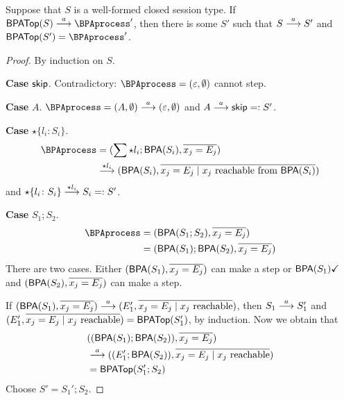 \begin{lemma}\label{lemma:bisimulation-BPA-backwards}
  Suppose that $S$ is a well-formed closed session type. If
  $\toBPATop{S} \LTSderives \BPAprocess'$, then there is some $S'$
  such that $S \LTSderives S'$ and $\toBPATop{S'} = \BPAprocess'$.
\end{lemma}
\begin{proof}
  By induction on $S$.

  \textbf{Case }$\skipk$. Contradictory: $\BPAprocess = (\varepsilon, \emptyset)$ cannot step.

  \textbf{Case }$A$. $\BPAprocess = (A, \emptyset)
  \LTSderives (\varepsilon, \emptyset)$ and $A \LTSderives \skipk =: S'$.

  \textbf{Case }$\star\{l_i\colon S_i\}$. 
  \begin{align*}
    \BPAprocess
    & = (\sum\star l_i; \toBPA{S_i},  \overline{x_j =  E_j}) \\
    & \LTSderives[\star l_i] (\toBPA{S_i}, \overline{x_j =  E_j \mid x_j \text{ reachable from }\toBPA{S_i}})
  \end{align*}
  and
  $\star\{l_i\colon S_i\} \LTSderives[\star l_i] S_i =: S'$.

  \textbf{Case }$S_1;S_2$.
  \begin{align*}
    \BPAprocess
    & = (\toBPA{S_1;S_2}, \overline{x_j =  E_j}) \\
    & = (\toBPA{S_1};\toBPA{S_2}, \overline{x_j =  E_j})
  \end{align*}
  There are two cases. Either $(\toBPA{S_1},\overline{x_j =  E_j}) $ can make a step or $\DONE{\toBPA{S_1}}$ and
  $(\toBPA{S_2}, \overline{x_j =  E_j})$ can make a step.

  If $(\toBPA{S_1},\overline{x_j =  E_j}) \LTSderives (E_1', \overline{x_j =  E_j \mid x_j \text{ reachable}})$,
  then $S_1 \LTSderives S_1'$ and $(E_1', \overline{x_j =  E_j \mid x_j \text{ reachable}})  = \toBPATop{S_1'}$, by induction.
  Now we obtain that
  \begin{align*}
    & ((\toBPA{S_1};\toBPA{S_2}), \overline{x_j =  E_j}) \\
    &\LTSderives ((E_1';
      \toBPA{S_2}), \overline{x_j =  E_j \mid x_j \text{ reachable}})\\
    &= \toBPATop{S_1'; S_2}
  \end{align*}
  Choose $S' = S_1';S_2$.


\end{proof}
